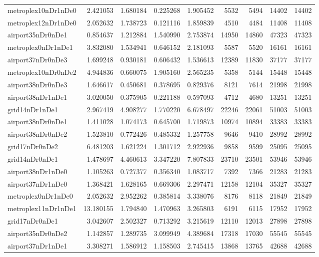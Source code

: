 \begin{longtable}{|l|r|r|r|r|r|r|r|r|}
metroplex10nDr1nDe0 & 2.421053 & 1.680184 & 0.225268 & 1.905452 & 5532 & 5494 & 14402 & 14402 \\
metroplex12nDr1nDe0 & 2.052632 & 1.738723 & 0.121116 & 1.859839 & 4510 & 4484 & 11408 & 11408 \\
airport35nDr0nDe1 & 0.854637 & 1.212884 & 1.540990 & 2.753874 & 14950 & 14860 & 47323 & 47323 \\
metroplex0nDr1nDe1 & 3.832080 & 1.534941 & 0.646152 & 2.181093 & 5587 & 5520 & 16161 & 16161 \\
airport37nDr0nDe3 & 1.699248 & 0.930181 & 0.606432 & 1.536613 & 12389 & 11830 & 37177 & 37177 \\
metroplex10nDr0nDe2 & 4.944836 & 0.660075 & 1.905160 & 2.565235 & 5358 & 5144 & 15448 & 15448 \\
airport38nDr0nDe3 & 1.646617 & 0.450681 & 0.378695 & 0.829376 & 8121 & 7614 & 21998 & 21998 \\
airport38nDr1nDe1 & 3.020050 & 0.375905 & 0.221188 & 0.597093 & 4712 & 4680 & 13251 & 13251 \\
grid14nDr1nDe1 & 2.967419 & 4.908277 & 1.770220 & 6.678497 & 22246 & 22061 & 51003 & 51003 \\
airport38nDr0nDe1 & 1.411028 & 1.074173 & 0.645700 & 1.719873 & 10974 & 10894 & 33383 & 33383 \\
airport38nDr0nDe2 & 1.523810 & 0.772426 & 0.485332 & 1.257758 & 9646 & 9410 & 28992 & 28992 \\
grid17nDr0nDe2 & 6.481203 & 1.621224 & 1.301712 & 2.922936 & 9858 & 9599 & 25095 & 25095 \\
grid14nDr0nDe1 & 1.478697 & 4.460613 & 3.347220 & 7.807833 & 23710 & 23501 & 53946 & 53946 \\
airport38nDr1nDe0 & 1.105263 & 0.727377 & 0.356340 & 1.083717 & 7392 & 7366 & 21283 & 21283 \\
airport37nDr1nDe0 & 1.368421 & 1.628165 & 0.669306 & 2.297471 & 12158 & 12104 & 35327 & 35327 \\
metroplex0nDr1nDe0 & 2.052632 & 2.952262 & 0.385814 & 3.338076 & 8176 & 8118 & 21849 & 21849 \\
metroplex11nDr1nDe1 & 13.180155 & 1.794840 & 1.470963 & 3.265803 & 6191 & 6115 & 17952 & 17952 \\
grid17nDr0nDe1 & 3.042607 & 2.502327 & 0.713292 & 3.215619 & 12110 & 12013 & 27898 & 27898 \\
airport35nDr0nDe2 & 1.142857 & 1.289735 & 3.099949 & 4.389684 & 17318 & 17030 & 55545 & 55545 \\
airport37nDr1nDe1 & 3.308271 & 1.586912 & 1.158503 & 2.745415 & 13868 & 13765 & 42688 & 42688 \\

\end{longtable}
